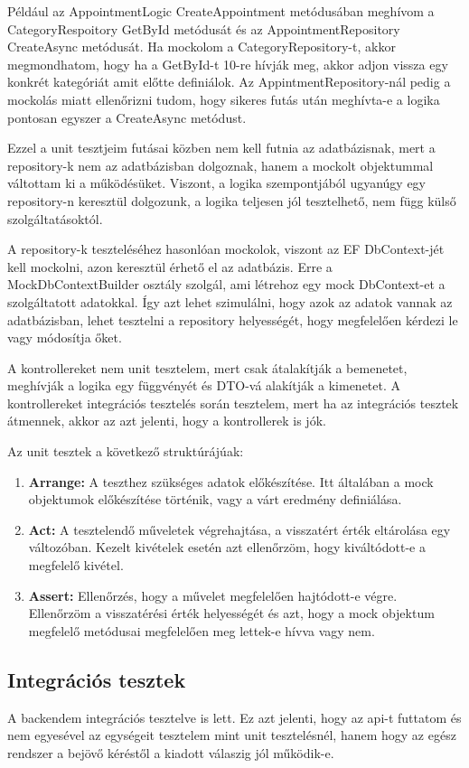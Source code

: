 Például az AppointmentLogic CreateAppointment metódusában meghívom a CategoryRespoitory GetById metódusát és az AppointmentRepository CreateAsync metódusát. Ha mockolom a CategoryRepository-t, akkor megmondhatom, hogy ha a GetById-t 10-re hívják meg, akkor adjon vissza egy konkrét kategóriát amit előtte definiálok. Az AppintmentRepository-nál pedig a mockolás miatt ellenőrizni tudom, hogy sikeres futás után meghívta-e a logika pontosan egyszer a CreateAsync metódust.

Ezzel a unit tesztjeim futásai közben nem kell futnia az adatbázisnak, mert a repository-k nem az adatbázisban dolgoznak, hanem a mockolt objektummal váltottam ki a működésüket. Viszont, a logika szempontjából ugyanúgy egy repository-n keresztül dolgozunk, a logika teljesen jól tesztelhető, nem függ külső szolgáltatásoktól.

A repository-k teszteléséhez hasonlóan mockolok, viszont az EF DbContext-jét kell mockolni, azon keresztül érhető el az adatbázis. Erre a MockDbContextBuilder osztály szolgál, ami létrehoz egy mock DbContext-et a szolgáltatott adatokkal. Így azt lehet szimulálni, hogy azok az adatok vannak az adatbázisban, lehet tesztelni a repository helyességét, hogy megfelelően kérdezi le vagy módosítja őket.

A kontrollereket nem unit tesztelem, mert csak átalakítják a bemenetet, meghívják a logika egy függvényét és DTO-vá alakítják a kimenetet. A kontrollereket integrációs tesztelés során tesztelem, mert ha az integrációs tesztek átmennek, akkor az azt jelenti, hogy a kontrollerek is jók.

Az unit tesztek a következő struktúrájúak:
\begin{enumerate}
	\item \textbf{Arrange:} A teszthez szükséges adatok előkészítése. Itt általában a mock objektumok előkészítése történik, vagy a várt eredmény definiálása.
	\item \textbf{Act:} A tesztelendő műveletek végrehajtása, a visszatért érték eltárolása egy változóban. Kezelt kivételek esetén azt ellenőrzöm, hogy kiváltódott-e a megfelelő kivétel.
	\item \textbf{Assert:} Ellenőrzés, hogy a művelet megfelelően hajtódott-e végre. Ellenőrzöm a visszatérési érték helyességét és azt, hogy a mock objektum megfelelő metódusai megfelelően meg lettek-e hívva vagy nem.
\end{enumerate}

\subsection{Integrációs tesztek}
\label{sec:integrationTests}
A backendem integrációs tesztelve is lett. Ez azt jelenti, hogy az api-t futtatom és nem egyesével az egységeit tesztelem mint unit tesztelésnél, hanem hogy az egész rendszer a bejövő kéréstől a kiadott válaszig jól működik-e.

